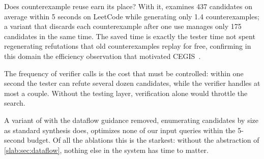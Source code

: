Does counterexample reuse earn its place? With it, \toolname examines
437 candidates on average within 5 seconds on LeetCode while
generating only 1.4 counterexamples; a variant that discards each
counterexample after one use manages only 175 candidates in the same
time. The saved time is exactly the tester time not spent regenerating
refutations that old counterexamples replay for free, confirming in
this domain the efficiency observation that motivated
CEGIS~\cite{solar2008program}.

The frequency of verifier calls is the cost that must be controlled:
within one second the tester can refute several dozen candidates,
while the verifier handles at most a couple. Without the testing
layer, verification alone would throttle the search.

A variant of \slabcity with the dataflow guidance removed, enumerating
candidates by size as standard synthesis does, optimizes none of our
input queries within the 5-second budget. Of all the ablations this is
the starkest: without the abstraction of \cref{slab:sec:dataflow},
nothing else in the system has time to matter.

